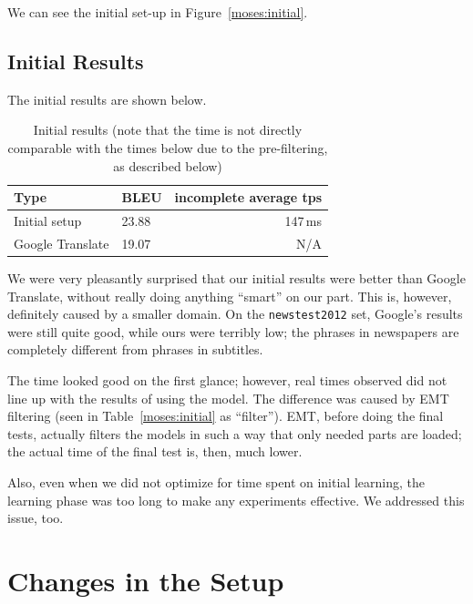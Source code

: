 We can see the initial set-up in Figure~\ref{moses:initial}.
\subsection{Initial Results}

The initial results are shown below.

\begin{table}[h]
\begin{center}
\begin{tabular}{|l|l|r|}
    \hline
    \textbf{Type} & \textbf{BLEU} & \textbf{incomplete average tps} \\ \hline
    Initial setup & 23.88 & 147\,ms \\ \hline
    Google Translate & 19.07 & N/A \\  \hline
\end{tabular}
\end{center}

\caption{Initial results (note that the time is not directly comparable with the times below due to the pre-filtering, as described below)}\label{moses:initialresults}
\end{table}

We were very pleasantly surprised that our initial results were better than Google Translate, without really doing anything ``smart'' on our part. This is, however, definitely caused by a smaller domain. On the \texttt{newstest2012} set, Google's results were still quite good, while ours were terribly low; the phrases in newspapers are completely different from phrases in subtitles.

The time looked good on the first glance; however, real times observed did not line up with the results of using the model. The difference was caused by EMT filtering (seen in Table~\ref{moses:initial} as ``filter''). EMT, before doing the final tests, actually filters the models in such a way that only needed parts are loaded; the actual time of the final test is, then, much lower.

Also, even when we did not optimize for time spent on initial learning, the learning phase was too long to make any experiments effective. We addressed this issue, too.

\section{Changes in the Setup}
